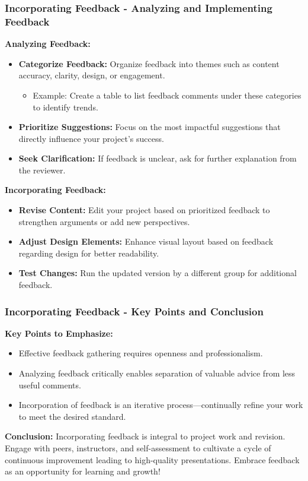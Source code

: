 \documentclass[aspectratio=169]{beamer}
\begin{document}
\begin{frame}[fragile]
    \frametitle{Incorporating Feedback - Analyzing and Implementing Feedback}
    
    \textbf{Analyzing Feedback:}
    \begin{itemize}
        \item \textbf{Categorize Feedback:} Organize feedback into themes such as content accuracy, clarity, design, or engagement.
        \begin{itemize}
            \item Example: Create a table to list feedback comments under these categories to identify trends.
        \end{itemize}
        
        \item \textbf{Prioritize Suggestions:} Focus on the most impactful suggestions that directly influence your project's success.
        
        \item \textbf{Seek Clarification:} If feedback is unclear, ask for further explanation from the reviewer.
    \end{itemize}

    \textbf{Incorporating Feedback:}
    \begin{itemize}
        \item \textbf{Revise Content:} Edit your project based on prioritized feedback to strengthen arguments or add new perspectives.
        \item \textbf{Adjust Design Elements:} Enhance visual layout based on feedback regarding design for better readability.
        \item \textbf{Test Changes:} Run the updated version by a different group for additional feedback.
    \end{itemize}
\end{frame}

\begin{frame}[fragile]
    \frametitle{Incorporating Feedback - Key Points and Conclusion}
    
    \textbf{Key Points to Emphasize:}
    \begin{itemize}
        \item Effective feedback gathering requires openness and professionalism.
        \item Analyzing feedback critically enables separation of valuable advice from less useful comments.
        \item Incorporation of feedback is an iterative process—continually refine your work to meet the desired standard.
    \end{itemize}

    \textbf{Conclusion:}
    Incorporating feedback is integral to project work and revision. Engage with peers, instructors, and self-assessment to cultivate a cycle of continuous improvement leading to high-quality presentations. Embrace feedback as an opportunity for learning and growth!
\end{frame}
\end{document}
